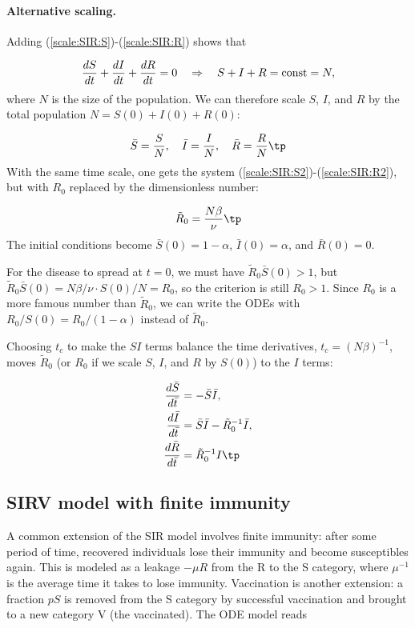 \documentclass[graybox,envcountchap,sectrefs,final]{svmonodo}
\begin{document}
\vspace{3mm}




\vspace{3mm}




\paragraph{Alternative scaling.}
Adding (\ref{scale:SIR:S})-(\ref{scale:SIR:R}) shows that

\[ \frac{dS}{dt}+\frac{dI}{dt}+\frac{dR}{dt}=0\quad\Rightarrow\quad
S+I+R=\hbox{const}=N,\]
where $N$ is the size of the population.
We can therefore scale $S$, $I$, and $R$ by the total
population $N=S(0)+I(0)+R(0)$:

\[ \bar S = \frac{S}{N},\quad \bar I = \frac{I}{N},\quad
\bar R = \frac{R}{N}\tp
\]
With the same time scale, one gets the system (\ref{scale:SIR:S2})-(\ref{scale:SIR:R2}), but with $R_0$ replaced by the dimensionless number:

\begin{equation}
\tilde R_0 = \frac{N\beta}{\nu}\tp
\end{equation}
The initial conditions become $\bar S(0)=1-\alpha$, $\bar I(0)=\alpha$,
and $\bar R(0)=0$.

For the disease to spread at $t=0$, we must have $\tilde R_0 \bar S(0) > 1$,
but $\tilde R_0 \bar S(0) = N\beta/\nu \cdot S(0)/N = R_0$, so the
criterion is still $R_0 > 1$. Since $R_0$ is a more famous number than
$\tilde R_0$, we can write the ODEs with $R_0/S(0) = R_0/(1-\alpha)$
instead of $\tilde R_0$.

Choosing $t_c$ to make the $SI$ terms balance the time derivatives,
$t_c = (N\beta)^{-1}$, moves $\tilde R_0$ (or $R_0$ if we scale
$S$, $I$, and $R$ by $S(0)$) to the $I$ terms:

\begin{align*}
\frac{d\bar S}{d\bar t} &= - \bar S\bar I,
\\ 
\frac{d\bar I}{d\bar t} &= \bar S\bar I - \tilde R_0^{-1} \bar I,
\\ 
\frac{d\bar R}{d\bar t} &= \tilde R_0^{-1} I\tp
\end{align*}

\subsection{SIRV model with finite immunity}

A common extension of the SIR model involves finite immunity: after
some period of time, recovered individuals lose their immunity
and become susceptibles again. This is modeled as
a leakage $-\mu R$ from the R to the S category, where $\mu^{-1}$
is the average time it takes to lose immunity.
Vaccination is another extension: a fraction $pS$ is removed from the
S category by successful vaccination and brought to a new category V (the
vaccinated). The ODE model reads
\end{document}
